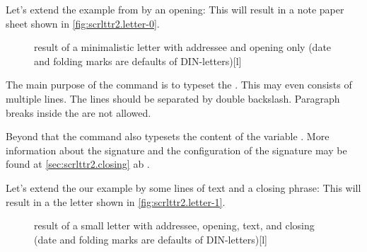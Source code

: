 \begin{Example}
  Let's extend the example from
   by an opening:
  This will result in a note paper sheet shown in
  \autoref{fig:scrlttr2.letter-0}.
  \begin{figure}
    \setcapindent{0pt}%
    \begin{captionbeside}{%
        result of a minimalistic letter with addressee and opening only 
        (date and folding marks are defaults of DIN-letters)}[l]
    \end{captionbeside}
    \label{fig:scrlttr2.letter-0}
  \end{figure}
\end{Example}
\iffalse%

In the early days of computer-generated letters, programs did not have many
capabilities, therefore the letters seldom had an opening.  Today the
capabilities have been enhanced. Thus personal openings are very common, even
in mass-production advertising letters.%
\fi
%
%

\begin{Declaration}
\end{Declaration}
%
The main purpose of the command  is to typeset the
. This may even consists of multiple
lines. The lines should be separated by double backslash. Paragraph breaks
inside the  are not allowed.

Beyond that the command also typesets the content of the variable
. More information about the signature and the
configuration of the signature may be found at \autoref{sec:scrlttr2.closing}
ab .

\begin{Example}
  Let's extend the our example by some lines of text and a closing phrase:
  This will result in a the letter shown in \autoref{fig:scrlttr2.letter-1}.
  \begin{figure}
    \setcapindent{0pt}%
    \begin{captionbeside}{%
        result of a small letter with addressee, opening, text, and closing
        (date and folding marks are defaults of DIN-letters)}[l]
    \end{captionbeside}
    \label{fig:scrlttr2.letter-1}
  \end{figure}
\end{Example}
%
%

